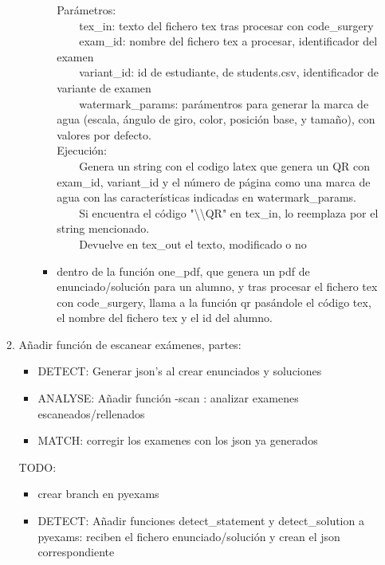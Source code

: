 \begin{itemize}
\begin{enumerate}
\begin{itemize}
\begin{itemize}
                Parámetros:\\
                \ \ \ \ tex\_in: texto del fichero tex tras procesar con code\_surgery\\
                \ \ \ \ exam\_id: nombre del fichero tex a procesar, identificador del examen\\
                \ \ \ \ variant\_id: id de estudiante, de students.csv, identificador de variante de examen\\
                \ \ \ \ watermark\_params: parámentros para generar la marca de agua (escala, ángulo de giro, color, posición base, y tamaño), con valores por defecto.\\
                Ejecución:\\
                \ \ \ \ Genera un string con el codigo latex que genera un QR con exam\_id, variant\_id y el número de página como una marca de agua con las características indicadas en watermark\_params.\\
                \ \ \ \ Si encuentra el código "\textbackslash{}\textbackslash{}QR" en tex\_in, lo reemplaza por el string mencionado.\\
                \ \ \ \ Devuelve en tex\_out el texto, modificado o no
                \item dentro de la función one\_pdf, que genera un pdf de enunciado/solución para un alumno, y tras procesar el fichero tex con code\_surgery, llama a la función qr pasándole el código tex, el nombre del fichero tex y el id del alumno.
            \end{itemize}
        \end{itemize}
        \item Añadir función de escanear exámenes, partes:
        \begin{itemize}
            \item DETECT: Generar json's al crear enunciados y soluciones
            \item ANALYSE: Añadir función -scan : analizar examenes escaneados/rellenados 
            \item MATCH: corregir los examenes con los json ya generados
        \end{itemize}
        TODO:
        \begin{itemize}
            \item crear branch en pyexams
            \item DETECT: Añadir funciones detect\_statement y detect\_solution a pyexams: reciben el fichero enunciado/solución y crean el json correspondiente

\end{itemize}
\end{enumerate}
\end{itemize}
